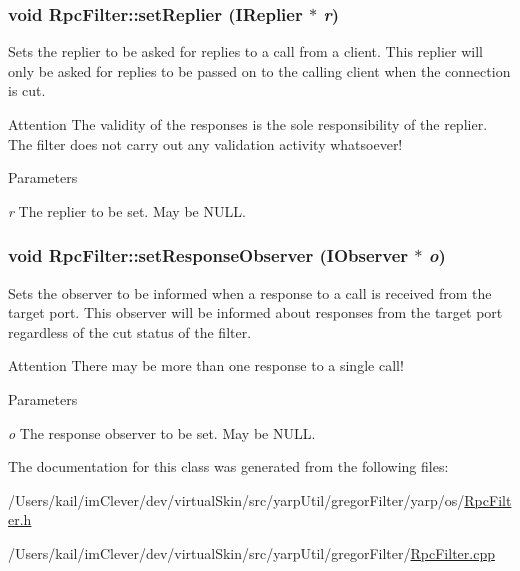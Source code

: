 \hypertarget{classyarp_1_1os_1_1_rpc_filter_a266cce1c8c9088b26ad7d6c65fc2201f}{
\subsubsection[{setReplier}]{\setlength{\rightskip}{0pt plus 5cm}void RpcFilter::setReplier ({\bf IReplier} $\ast$ {\em r})}}
\label{classyarp_1_1os_1_1_rpc_filter_a266cce1c8c9088b26ad7d6c65fc2201f}
Sets the replier to be asked for replies to a call from a client. This replier will only be asked for replies to be passed on to the calling client when the connection is cut.

\begin{DoxyAttention}{Attention}
The validity of the responses is the sole responsibility of the replier. The filter does not carry out any validation activity whatsoever! 
\end{DoxyAttention}

\begin{DoxyParams}{Parameters}
\item[{\em r}]The replier to be set. May be {\ttfamily NULL}. \end{DoxyParams}
\hypertarget{classyarp_1_1os_1_1_rpc_filter_a9842c9621ae44b7f09e7faf33277dc05}{
\subsubsection[{setResponseObserver}]{\setlength{\rightskip}{0pt plus 5cm}void RpcFilter::setResponseObserver ({\bf IObserver} $\ast$ {\em o})}}
\label{classyarp_1_1os_1_1_rpc_filter_a9842c9621ae44b7f09e7faf33277dc05}
Sets the observer to be informed when a response to a call is received from the target port. This observer will be informed about responses from the target port regardless of the cut status of the filter.

\begin{DoxyAttention}{Attention}
There may be more than one response to a single call! 
\end{DoxyAttention}

\begin{DoxyParams}{Parameters}
\item[{\em o}]The response observer to be set. May be {\ttfamily NULL}. \end{DoxyParams}


The documentation for this class was generated from the following files:\begin{DoxyCompactItemize}
\item 
/Users/kail/imClever/dev/virtualSkin/src/yarpUtil/gregorFilter/yarp/os/\hyperlink{_rpc_filter_8h}{RpcFilter.h}\item 
/Users/kail/imClever/dev/virtualSkin/src/yarpUtil/gregorFilter/\hyperlink{_rpc_filter_8cpp}{RpcFilter.cpp}\end{DoxyCompactItemize}
